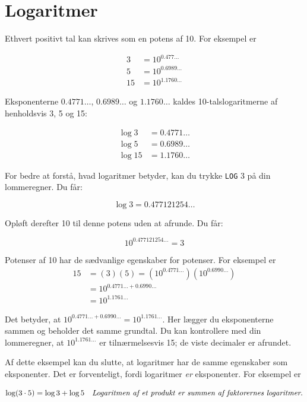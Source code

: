 \section{Logaritmer}
Ethvert positivt tal kan skrives som en potens af 10. For eksempel er

\[
\begin{aligned}
3 & = 10^{0.477 \ldots} \\
5 & = 10^{0.6989 \ldots} \\
15 & = 10^{1.1760 \ldots}
\end{aligned}
\]

Eksponenterne \(0.4771 \ldots\), \(0.6989 \ldots\) og \(1.1760 \ldots\) kaldes 10-talslogaritmerne af henholdsvis 3, 5 og 15:

\[
\begin{aligned}
\log 3 & = 0.4771 \ldots \\
\log 5 & = 0.6989 \ldots \\
\log 15 & = 1.1760 \ldots
\end{aligned}
\]

For bedre at forstå, hvad logaritmer betyder, kan du trykke \texttt{LOG} 3 på din lommeregner. Du får:

\[
\log 3 = 0.477121254 \ldots
\]

Opløft derefter 10 til denne potens uden at afrunde. Du får:

\[
10^{0.477121254 \ldots} = 3
\]

Potenser af 10 har de sædvanlige egenskaber for potenser. For eksempel er
\[
\begin{aligned}
15 & = (3)(5) = \left(10^{0.4771 \ldots}\right)\left(10^{0.6990 \ldots}\right) \\
& = 10^{0.4771 \ldots + 0.6990 \ldots} \\
& = 10^{1.1761 \ldots}
\end{aligned}
\]

Det betyder, at \(10^{0.4771 \ldots + 0.6990 \ldots} = 10^{1.1761 \ldots}\). Her lægger du eksponenterne sammen og beholder det samme grundtal. Du kan kontrollere med din lommeregner, at \(10^{1.1761 \ldots}\) er tilnærmelsesvis 15; de viste decimaler er afrundet.

Af dette eksempel kan du slutte, at logaritmer har de samme egenskaber som eksponenter. Det er forventeligt, fordi logaritmer \textit{er} eksponenter. For eksempel er

\[
\log(3 \cdot 5) = \log 3 + \log 5 \quad \text{\textit{Logaritmen af et produkt er summen af faktorernes logaritmer}.}
\]

